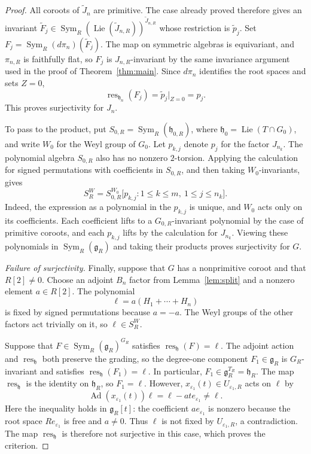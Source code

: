 \documentclass[twoside,a4paper,12pt,reqno]{amsart}
\theoremstyle{remark}
\numberwithin{equation}{section}
\newcommand{\fg}{\mathfrak g}
\newcommand{\fh}{\mathfrak h}
\DeclareMathOperator{\Sym}{Sym}
\DeclareMathOperator{\Lie}{Lie}
\DeclareMathOperator{\Ad}{Ad}
\begin{document}
\begin{proof}
All coroots of \(\widetilde J_n\) are primitive. The case already
proved therefore gives an invariant
\(\widetilde F_j\in\Sym_R(\Lie(\widetilde J_{n,R}))^{\widetilde J_{n,R}}\)
whose restriction is \(\widetilde p_j\).
Set \(F_j=\Sym_R(d\pi_n)(\widetilde F_j)\).
The map on symmetric algebras is equivariant, and \(\pi_{n,R}\)
is faithfully flat, so \(F_j\) is \(J_{n,R}\)-invariant by the same
invariance argument used in the proof of Theorem~\ref{thm:main}.
Since \(d\pi_n\) identifies the root spaces and sets \(Z=0\),
\[
\operatorname{res}_{\fh_n}(F_j)
=\widetilde p_j|_{Z=0}=p_j.
\]
This proves surjectivity for \(J_n\).

To pass to the product, put
\(S_{0,R}=\Sym_R(\fh_{0,R})\), where \(\fh_0=\Lie(T\cap G_0)\),
and write \(W_0\) for the Weyl group of \(G_0\).
Let \(p_{k,j}\) denote \(p_j\) for the factor \(J_{n_k}\).
The polynomial algebra \(S_{0,R}\) also has no nonzero \(2\)-torsion.
Applying the calculation for signed permutations with coefficients in
\(S_{0,R}\), and then taking \(W_0\)-invariants, gives
\[
S_R^W=S_{0,R}^{W_0}
\bigl[p_{k,j}:1\le k\le m,\ 1\le j\le n_k\bigr].
\]
Indeed, the expression as a polynomial in the \(p_{k,j}\) is unique,
and \(W_0\) acts only on its coefficients.
Each coefficient lifts to a \(G_{0,R}\)-invariant polynomial by the
case of primitive coroots, and each \(p_{k,j}\) lifts by the calculation
for \(J_{n_k}\). Viewing these polynomials in \(\Sym_R(\fg_R)\)
and taking their products proves surjectivity for \(G\).

\smallskip
\noindent\emph{Failure of surjectivity.}
Finally, suppose that \(G\) has a nonprimitive coroot and that
\(R[2]\ne0\). Choose an adjoint \(B_n\) factor from Lemma~\ref{lem:split}
and a nonzero element \(a\in R[2]\). The polynomial
\[
\ell=a(H_1+\cdots+H_n)
\]
is fixed by signed permutations because \(a=-a\).
The Weyl groups of the other factors act trivially on it, so
\(\ell\in S_R^W\).

Suppose that \(F\in\Sym_R(\fg_R)^{G_R}\) satisfies
\(\operatorname{res}_{\fh}(F)=\ell\).
The adjoint action and \(\operatorname{res}_{\fh}\) both preserve the grading, so
the degree-one component \(F_1\in\fg_R\) is \(G_R\)-invariant and
satisfies \(\operatorname{res}_{\fh}(F_1)=\ell\).
In particular, \(F_1\in\fg_R^{T_R}=\fh_R\).
The map \(\operatorname{res}_{\fh}\) is the identity on \(\fh_R\), so \(F_1=\ell\).
However, \(x_{\varepsilon_1}(t)\in U_{\varepsilon_1,R}\) acts on \(\ell\) by
\[
\Ad(x_{\varepsilon_1}(t))\ell
=\ell-at e_{\varepsilon_1}\ne\ell.
\]
Here the inequality holds in \(\fg_R[t]\): the coefficient
\(ae_{\varepsilon_1}\) is nonzero because the root space
\(R e_{\varepsilon_1}\) is free and \(a\ne0\).
Thus \(\ell\) is not fixed by \(U_{\varepsilon_1,R}\), a contradiction.
The map \(\operatorname{res}_{\fh}\) is therefore not surjective in this case, which proves
the criterion.
\end{proof}
\end{document}
